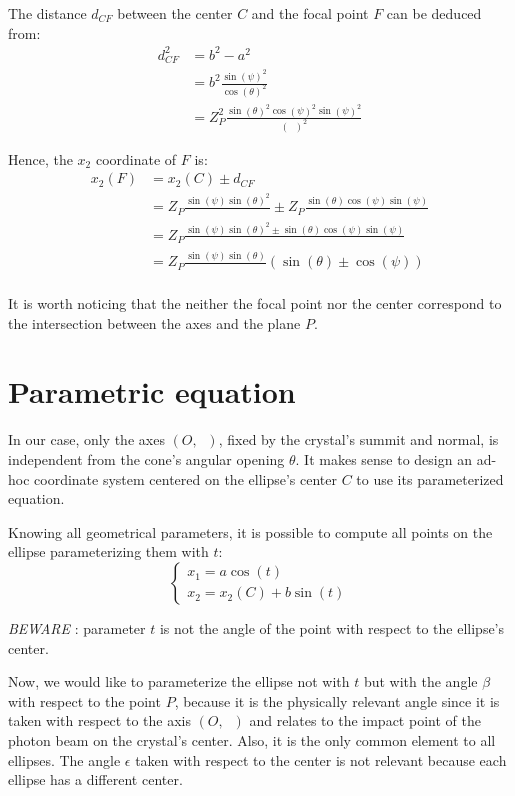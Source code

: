 \documentclass[a4paper,11pt,twoside,titlepage,openright]{book}
\numberwithin{equation}{section}
\newcommand{\lt}{\left}
\newcommand{\rt}{\right}
\DeclareMathOperator{\ez}{\underline{e}_z}
\DeclareMathOperator{\DD}{\cos(\theta)^2 - \sin(\psi)^2}
\begin{document}
The distance $d_{CF}$ between the center $C$ and the focal point $F$ can be deduced from:
$$
\begin{array}{lll}
	d_{CF}^2 & = b^2-a^2\\
		& = b^2\frac{\sin(\psi)^2}{\cos(\theta)^2}\\
		& = Z_P^2\frac{\sin(\theta)^2\cos(\psi)^2\sin(\psi)^2}{\lt(\DD\rt)^2}
\end{array}
$$

Hence, the $x_2$ coordinate of $F$ is:
$$
\begin{array}{lll}
	x_2(F) & = x_2(C) \pm d_{CF}\\
	       & = Z_P\frac{\sin(\psi)\sin(\theta)^2}{\DD} \pm Z_P\frac{\sin(\theta)\cos(\psi)\sin(\psi)}{\DD}\\
	       & = Z_P\frac{\sin(\psi)\sin(\theta)^2 \pm \sin(\theta)\cos(\psi)\sin(\psi)}{\DD}\\
	       & = Z_P\frac{\sin(\psi)\sin(\theta)}{\DD}\lt(\sin(\theta) \pm \cos(\psi)\rt)\\
\end{array}
$$

It is worth noticing that the neither the focal point nor the center correspond to the intersection between the axes and the plane $P$.


\section{Parametric equation}

In our case, only the axes $(O, \ez)$, fixed by the crystal's summit and normal, is independent from the cone's angular opening $\theta$.
It makes sense to design an ad-hoc coordinate system centered on the ellipse's center $C$ to use its parameterized equation.

Knowing all geometrical parameters, it is possible to compute all points on the ellipse parameterizing them with $t$:
$$
\lt\{
	\begin{array}{lll}
		x_1 = a\cos(t)\\
		x_2 = x_2(C) + b\sin(t)
	\end{array}
\rt.
$$

\emph{BEWARE} : parameter $t$ is not the angle of the point with respect to the ellipse's center.

Now, we would like to parameterize the ellipse not with $t$ but with the angle $\beta$ with respect to the point $P$, because it is the physically relevant angle since it is taken with respect to the axis $(O, \ez)$ and relates to the impact point of the photon beam on the crystal's center. Also, it is the only common element to all ellipses.
The angle $\epsilon$ taken with respect to the center is not relevant because each ellipse has a different center.
\end{document}

